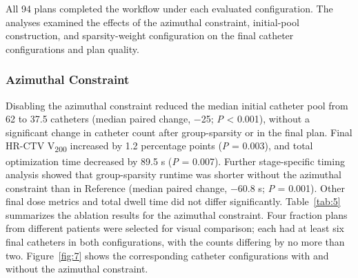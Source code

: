 \documentclass[12pt,twoside,letterpaper]{article}
\begin{document}
All 94 plans completed the workflow under each evaluated configuration. The analyses examined the effects of the azimuthal constraint, initial-pool construction, and sparsity-weight configuration on the final catheter configurations and plan quality.

\subsubsection{Azimuthal Constraint}\label{sec:3-3-1}

Disabling the azimuthal constraint reduced the median initial catheter pool from 62 to 37.5 catheters (median paired change, \ensuremath{-}25; \emph{P} < 0.001), without a significant change in catheter count after group-sparsity or in the final plan. Final HR-CTV V\textsubscript{200} increased by 1.2 percentage points (\emph{P} = 0.003), and total optimization time decreased by 89.5 s (\emph{P} = 0.007). Further stage-specific timing analysis showed that group-sparsity runtime was shorter without the azimuthal constraint than in Reference (median paired change, \ensuremath{-}60.8 s; \emph{P} = 0.001). Other final dose metrics and total dwell time did not differ significantly. Table~\ref{tab:5} summarizes the ablation results for the azimuthal constraint. Four fraction plans from different patients were selected for visual comparison; each had at least six final catheters in both configurations, with the counts differing by no more than two. Figure~\ref{fig:7} shows the corresponding catheter configurations with and without the azimuthal constraint.
\end{document}
